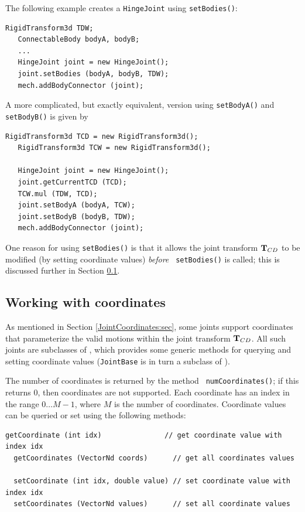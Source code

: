 The following example creates a {\tt HingeJoint} using {\tt setBodies()}:
%
\begin{lstlisting}[]
   RigidTransform3d TDW;
   ConnectableBody bodyA, bodyB;
   ...
   HingeJoint joint = new HingeJoint();
   joint.setBodies (bodyA, bodyB, TDW);
   mech.addBodyConnector (joint);
\end{lstlisting}
%
A more complicated, but exactly equivalent, version using {\tt setBodyA()} and
{\tt setBodyB()} is given by
%
\begin{lstlisting}[]
   RigidTransform3d TCD = new RigidTransform3d();
   RigidTransform3d TCW = new RigidTransform3d();

   HingeJoint joint = new HingeJoint();
   joint.getCurrentTCD (TCD);
   TCW.mul (TDW, TCD);
   joint.setBodyA (bodyA, TCW);
   joint.setBodyB (bodyB, TDW);
   mech.addBodyConnector (joint);
\end{lstlisting}
%
One reason for using {\tt setBodies()} is that it allows the joint transform
${\bf T}_{CD}$ to be modified (by setting coordinate values) {\it before} {\tt
setBodies()} is called; this is discussed further in
Section \ref{workingWithCoordinates:sec}.

\subsection{Working with coordinates}
\label{workingWithCoordinates:sec}

As mentioned in Section \ref{JointCoordinates:sec}, some joints
support coordinates that parameterize the valid motions within the
joint transform ${\bf T}_{CD}$. All such joints are subclasses of
,
which provides some generic methods for querying and setting
coordinate values ({\tt JointBase} is in turn a subclass of
).

The number of coordinates is returned by the method {\tt
numCoordinates()}; if this returns 0, then coordinates are not
supported. Each coordinate has an index in the range $0 \ldots M-1$,
where $M$ is the number of coordinates. Coordinate values can be
queried or set using the following methods:
\begin{lstlisting}[]
  getCoordinate (int idx)               // get coordinate value with index idx
  getCoordinates (VectorNd coords)      // get all coordinates values

  setCoordinate (int idx, double value) // set coordinate value with index idx
  setCoordinates (VectorNd values)      // set all coordinate values
\end{lstlisting}
%

